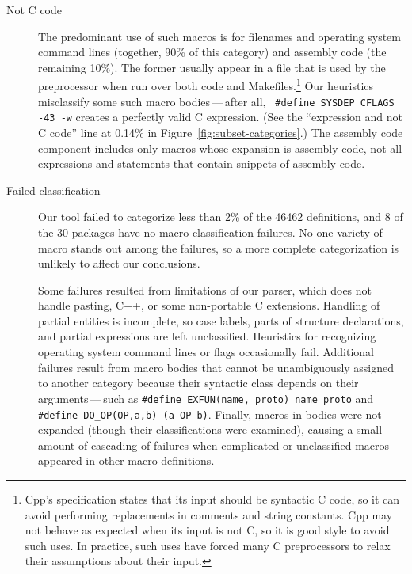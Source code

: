 \documentclass[10pt]{article}
\def\numpackages{30}
\begin{document}
\begin{description}
\item[Not C code]\label{page:not-c-code}
  The predominant use of such macros is for filenames and operating system
  command lines (together, 90\% of this category) and assembly code (the
  remaining 10\%).  The former usually appear in a file that is used by
  the preprocessor when run over both code and Makefiles.\footnote{Cpp's
    specification states that its input should be syntactic C code, so it
    can avoid performing replacements in comments and string constants.
    Cpp may not behave as expected when its input is not C, so it is good
    style to avoid such uses.  In practice, such uses have forced many C
    preprocessors to relax their assumptions about their input.}  Our
  heuristics misclassify some such macro bodies\,---\,after all, {\tt
  \#define \verb|SYSDEP_CFLAGS| -43 -w} creates a perfectly valid C
expression.  (See the ``expression and not C code'' line at 0.14\% in
Figure~\ref{fig:subset-categories}.)  The assembly code component includes
only macros whose expansion is assembly code, not all expressions and
statements that contain snippets of assembly code.

\item[Failed classification]
  Our tool failed to categorize less than 2\% of the 46462 definitions, and
  8 of the {\numpackages} packages have no macro classification failures.
  No one variety of macro stands out among the failures, so a more complete
  categorization is unlikely to affect our conclusions.
  
  Some failures resulted from limitations of our parser, which does not
  handle pasting, C++, or some
  non-portable C extensions.  Handling of partial entities is incomplete,
  so case labels, parts of structure declarations, and partial expressions
  are left unclassified.  Heuristics for recognizing operating system
  command lines or flags occasionally fail.  Additional failures result
  from macro bodies that cannot be unambiguously assigned to another
  category because their syntactic class depends on their
  arguments\,---\,such as {\tt \#define EXFUN(name, proto) name proto} and
  {\tt \#define
\verb|DO_OP|(OP,a,b) (a OP b)}.  Finally, macros in bodies were not
expanded (though their classifications were examined), causing a small
amount of cascading of failures when complicated or unclassified macros
appeared in other macro definitions.

\end{description}
\end{document}
